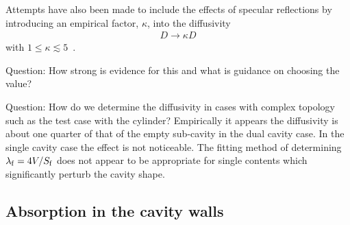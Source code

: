 \documentclass[a4paper]{article}
\numberwithin{equation}{section}
\begin{document}
Attempts have also been made to include the effects of specular reflections by
introducing an empirical factor, ${\kappa}$, into the diffusivity 
\begin{align}
D \rightarrow \kappa D
\end{align}
with $1\leq\kappa\lesssim 5$~\citep{Foy2009}. 

{\color{red} Question: How strong is evidence for this and what is guidance on choosing the
value?}

{\color{red} Question: How do we determine the diffusivity in cases with complex topology such as
the test case with the cylinder? Empirically it appears the diffusivity is about one quarter of that
of the empty sub-cavity in the dual cavity case. In the single cavity case the effect is not
noticeable. The fitting method of determining $\lambda_{\mathrm{f}} = 4V/S_{\mathrm{f}}$ does not appear to be
appropriate for single contents which significantly perturb the cavity shape.}

\subsection[Absorption in the cavity walls]{Absorption in the cavity walls}
\label{sc:sum:abs}
\end{document}
